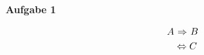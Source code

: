 \documentclass[12pt,a4paper]{article}
\newcommand{\assignment}[1]{
	{
		\vspace*{0.5cm}
		\noindent\Large{\textbf{Aufgabe #1}}
		\vspace*{0.2cm}
		\newline
	}
}
\begin{document}
	\assignment{1}
	\begin{enumbf}
		\item
		\begin{align*}
		A &{\ \Rightarrow \ } B\\
		&\Leftrightarrow C
		\end{align*}
	\end{enumbf}
\end{document}
